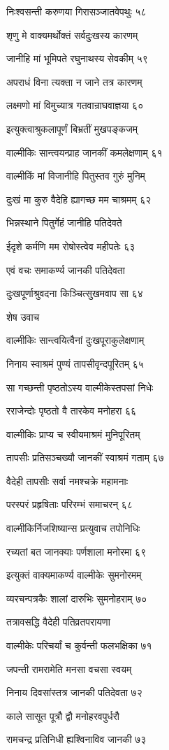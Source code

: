 निःश्वसन्ती करुणया गिरासञ्जातवेपथुः ५८

शृणु मे वाक्यमर्थोक्तं सर्वदुःखस्य कारणम्

जानीहि मां भूमिपते रघुनाथस्य सेवकीम् ५९

अपराधं विना त्यक्ता न जाने तत्र कारणम्

लक्ष्मणो मां विमुच्यात्र गतवान्राघवाज्ञया ६०

इत्युक्त्वाश्रुकलापूर्णं बिभ्रतीं मुखपङ्कजम्

वाल्मीकिः सान्त्वयन्प्राह जानकीं कमलेक्षणाम् ६१

वाल्मीकिं मां विजानीहि पितुस्तव गुरुं मुनिम्

दुःखं मा कुरु वैदेहि ह्यागच्छ मम चाश्रमम् ६२

भिन्नस्थाने पितुर्गेहं जानीहि पतिदेवते

ईदृशे कर्मणि मम रोषोस्त्वेव महीपतेः ६३

एवं वचः समाकर्ण्य जानकी पतिदेवता

दुःखपूर्णाश्रुवदना किञ्चित्सुखमवाप सा ६४

शेष उवाच

वाल्मीकिः सान्त्वयित्वैनां दुःखपूराकुलेक्षणाम्

निनाय स्वाश्रमं पुण्यं तापसीवृन्दपूरितम् ६५

सा गच्छन्ती पृष्ठतोऽस्य वाल्मीकेस्तपसां निधेः

रराजेन्दोः पृष्ठतो वै तारकेव मनोहरा ६६

वाल्मीकिः प्राप्य च स्वीयमाश्रमं मुनिपूरितम्

तापसीः प्रतिसञ्चख्यौ जानकीं स्वाश्रमं गताम् ६७

वैदेही तापसीः सर्वा नमश्चक्रे महामनाः

परस्परं प्रहृषिताः परिरम्भं समाचरन् ६८

वाल्मीकिर्निजशिष्यान्स प्रत्युवाच तपोनिधिः

रच्यतां बत जानक्याः पर्णशाला मनोरमा ६९

इत्युक्तं वाक्यमाकर्ण्य वाल्मीकेः सुमनोरमम्

व्यरचन्पत्रकैः शालां दारुभिः सुमनोहराम् ७०

तत्रावसद्धि वैदेही पतिव्रतपरायणा

वाल्मीकेः परिचर्यां च कुर्वन्ती फलभक्षिका ७१

जपन्ती रामरामेति मनसा वचसा स्वयम्

निनाय दिवसांस्तत्र जानकी पतिदेवता ७२

काले सासूत पूत्रौ द्वौ मनोहरवपुर्धरौ

रामचन्द्र प्रतिनिधी ह्यश्विनाविव जानकी ७३

